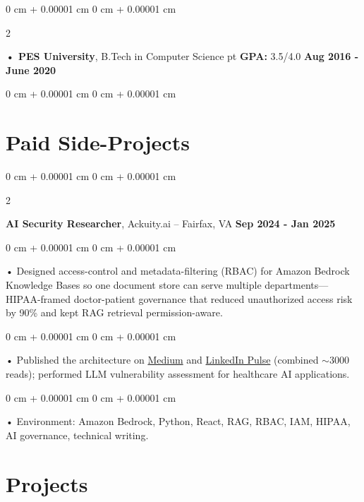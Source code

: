\documentclass[10pt, letterpaper]{article}
\newenvironment{onecolentry}{
    \begin{adjustwidth}{
        0 cm + 0.00001 cm
    }{
        0 cm + 0.00001 cm
    }
}{
    \end{adjustwidth}
} %
\newenvironment{twocolentry}[2][]{
    \onecolentry
    \def\secondColumn{#2}
    \setcolumnwidth{\fill, 4.5 cm}
    \begin{paracol}{2}
}{
    \switchcolumn \raggedleft \secondColumn
    \end{paracol}
    \endonecolentry
} %
\begin{document}
        \begin{twocolentry}{
            \textbf{Aug 2016 - June 2020}
        }
            \textbf{ • PES University}, B.Tech in Computer Science  pt \textbf{GPA:} 3.5/4.0  \end{twocolentry}
        \begin{onecolentry}

                        \vspace{0.4cm}
    \section{Paid Side-Projects}
            \vspace{2 pt }
                    \begin{twocolentry}{
            \textbf{Sep 2024 - Jan 2025}
        }
            \textbf{AI Security Researcher}, Ackuity.ai -- Fairfax, VA\end{twocolentry}

        \begin{onecolentry}
             • Designed access-control and metadata-filtering (RBAC) for Amazon Bedrock Knowledge Bases so one document store can serve multiple departments---HIPAA-framed doctor-patient governance that reduced unauthorized access risk by 90\% and kept RAG retrieval permission-aware.
        \end{onecolentry}
        \begin{onecolentry}
             • Published the architecture on \href{https://medium.com/@sreenikethaathreya/building-a-permission-aware-genai-application-on-amazon-bedrock-8fdc2410dd43}{Medium} and \href{https://www.linkedin.com/pulse/building-permission-aware-genai-application-amazon-bedrock-aathreya-g7nme/}{LinkedIn Pulse} (combined {$\sim$}3000 reads); performed LLM vulnerability assessment for healthcare AI applications.
        \end{onecolentry}
        \begin{onecolentry}
             • Environment: Amazon Bedrock, Python, React, RAG, RBAC, IAM, HIPAA, AI governance, technical writing.

        \end{onecolentry}

        \vspace{0.4cm}
\section{Projects}
    \vspace{2 pt}
\end{onecolentry}
\end{document}
